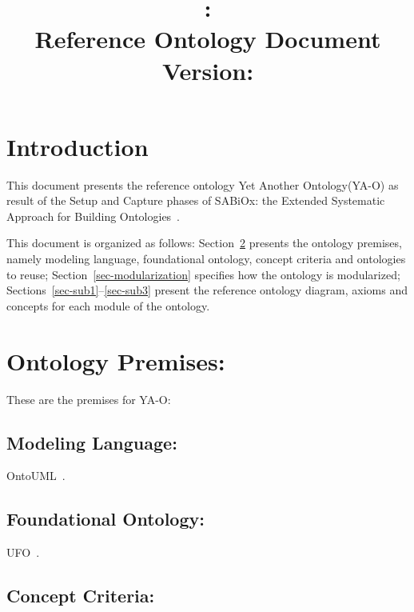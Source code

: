 \documentclass[table,usenames,dvipsnames]{article}
\title{\ontologyacronym: \ontologyname
	\\{\large Reference Ontology Document}
	\\{\normalsize Version: \documentversion}}
\author{\authorname}
\newcommand{\sabiox}{SABiOx\xspace}
\newcommand{\sabioxfull}{Extended Systematic Approach for Building Ontologies\xspace}
\newcommand{\ontologyacronym}{YA-O\xspace}
\newcommand{\ontologyname}{Yet Another Ontology\xspace}
\begin{document}
\maketitle


\section{Introduction}

This document presents the reference ontology \ontologyname (\ontologyacronym) as result of the Setup and Capture phases of \sabiox: the \sabioxfull~\cite{aguiar-souza:report24}.

This document is organized as follows:
	Section~\ref{sec-premises} presents the ontology premises, namely modeling language, foundational ontology, concept criteria and ontologies to reuse;
	Section~\ref{sec-modularization} specifies how the ontology is modularized;
	Sections~\ref{sec-sub1}--\ref{sec-sub3} present the reference ontology diagram, axioms and concepts for each module of the ontology.


\section{Ontology Premises:}
\label{sec-premises}

These are the premises for \ontologyacronym:


\subsection{Modeling Language:}
\label{sec-premises-language}

OntoUML~\cite{guizzardi-et-al:er18}.



\subsection{Foundational Ontology:}
\label{sec-premises-foundational}

UFO~\cite{guizzardi-et-al:aoj22}.



\subsection{Concept Criteria:}
\label{sec-premises-criteria}

\renewcommand*\thecrcount{CR-\arabic{crcount}}
\newcommand*\CR{\refstepcounter{crcount}\thecrcount}
\setcounter{crcount}{0}
\end{document}
